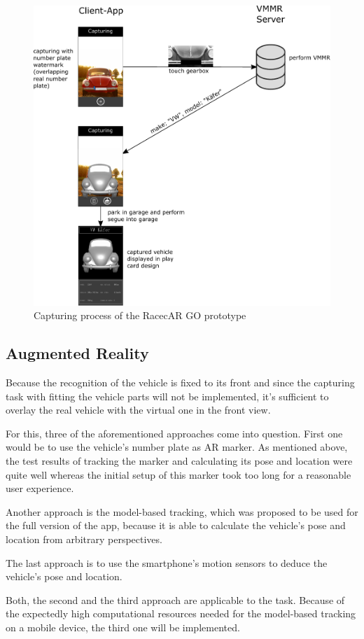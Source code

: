 \begin{figure}[bth]
  \centering
        \includegraphics[width=.75\linewidth]{gfx/capturing_limited}
        \caption{Capturing process of the RacecAR GO prototype}
        \label{fig:capturingLimited}
\end{figure}

\subsection{Augmented Reality}
Because the recognition of the vehicle is fixed to its front and since the capturing task with fitting the vehicle parts will not be implemented, it’s sufficient to overlay the real vehicle with the virtual one in the front view.

For this, three of the aforementioned approaches come into question. First one would be to use the vehicle’s number plate as AR marker. As mentioned above, the test results of tracking the marker and calculating its pose and location were quite well whereas the initial setup of this marker took too long for a reasonable user experience.

Another approach is the model-based tracking, which was proposed to be used for the full version of the app, because it is able to calculate the vehicle’s pose and location from arbitrary perspectives.

The last approach is to use the smartphone’s motion sensors to deduce the vehicle’s pose and location.

Both, the second and the third approach are applicable to the task. Because of the expectedly high computational resources needed for the model-based tracking on a mobile device, the third one will be implemented.


